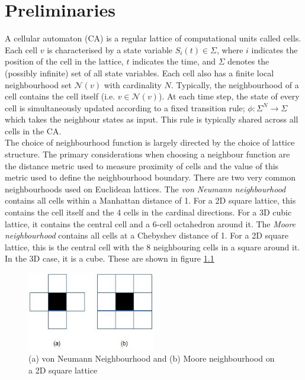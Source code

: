 \chapter{Preliminaries}

A cellular automaton (CA) is a regular lattice of computational units called cells. Each cell $v$ is characterised by a state variable $S_i(t) \in \Sigma$, where $i$ indicates the position of the cell in the lattice, $t$ indicates the time, and $\Sigma$ denotes the (possibly infinite) set of all state variables. Each cell also has a finite local neighbourhood set $\mathcal{N}(v)$ with cardinality $N$. Typically, the neighbourhood of a cell contains the cell itself (i.e. $v \in \mathcal{N}(v)$). At each time step, the state of every cell is simultaneously updated according to a fixed transition rule; $\phi:\Sigma^N \to \Sigma$ which takes the neighbour states as input. This rule is typically shared across all cells in the CA.\\

The choice of neighbourhood function is largely directed by the choice of lattice structure. The primary considerations when choosing a neighbour function are the distance metric used to measure proximity of cells and the value of this metric used to define the neighbourhood boundary. There are two very common neighbourhoods used on Euclidean lattices. The \textit{von Neumann neighbourhood} contains all cells within a Manhattan distance of 1. For a 2D square lattice, this contains the cell itself and the 4 cells in the cardinal directions. For a 3D cubic lattice, it contains the central cell and a 6-cell octahedron around it. The \textit{Moore neighbourhood} contains all cells at a Chebyshev distance of 1. For a 2D square lattice, this is the central cell with the 8 neighbouring cells in a square around it. In the 3D case, it is a cube. These are shown in figure \ref{fig:neighbourhoods}

\begin{figure}[!h]
\centering
\includegraphics[width=0.5\textwidth]{images/neighbourhoods.png}
\caption{(a) von Neumann Neighbourhood and (b) Moore neighbourhood on a 2D square lattice \cite{debasis2011survey}}
\label{fig:neighbourhoods}
\end{figure}

